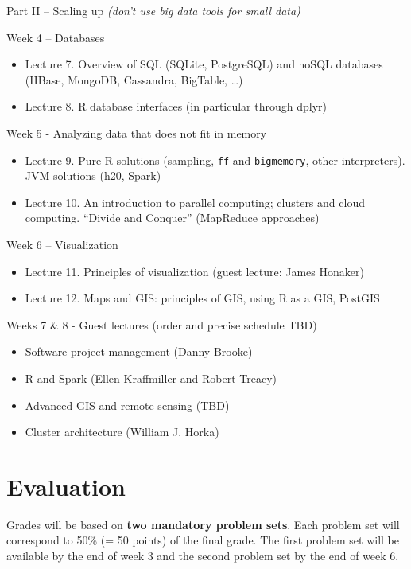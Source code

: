 \documentclass[]{book}
\providecommand{\tightlist}{%
  \setlength{\itemsep}{0pt}\setlength{\parskip}{0pt}}
\theoremstyle{definition}
\theoremstyle{definition}
\theoremstyle{definition}
\theoremstyle{remark}
\begin{document}
Part II -- Scaling up \emph{(don't use big data tools for small data)}

Week 4 -- Databases

\begin{itemize}
\tightlist
\item
  Lecture 7. Overview of SQL (SQLite, PostgreSQL) and noSQL databases
  (HBase, MongoDB, Cassandra, BigTable, \ldots{})
\item
  Lecture 8. R database interfaces (in particular through dplyr)
\end{itemize}

Week 5 - Analyzing data that does not fit in memory

\begin{itemize}
\tightlist
\item
  Lecture 9. Pure R solutions (sampling, \texttt{ff} and
  \texttt{bigmemory}, other interpreters). JVM solutions (h20, Spark)
\item
  Lecture 10. An introduction to parallel computing; clusters and cloud
  computing. ``Divide and Conquer'' (MapReduce approaches)
\end{itemize}

Week 6 -- Visualization

\begin{itemize}
\tightlist
\item
  Lecture 11. Principles of visualization (guest lecture: James Honaker)
\item
  Lecture 12. Maps and GIS: principles of GIS, using R as a GIS, PostGIS
\end{itemize}

Weeks 7 \& 8 - Guest lectures (order and precise schedule TBD)

\begin{itemize}
\tightlist
\item
  Software project management (Danny Brooke)
\item
  R and Spark (Ellen Kraffmiller and Robert Treacy)
\item
  Advanced GIS and remote sensing (TBD)
\item
  Cluster architecture (William J. Horka)
\end{itemize}

\section{Evaluation}\label{evaluation}

Grades will be based on \textbf{two mandatory problem sets}. Each
problem set will correspond to 50\% (= 50 points) of the final grade.
The first problem set will be available by the end of week 3 and the
second problem set by the end of week 6.
\end{document}
